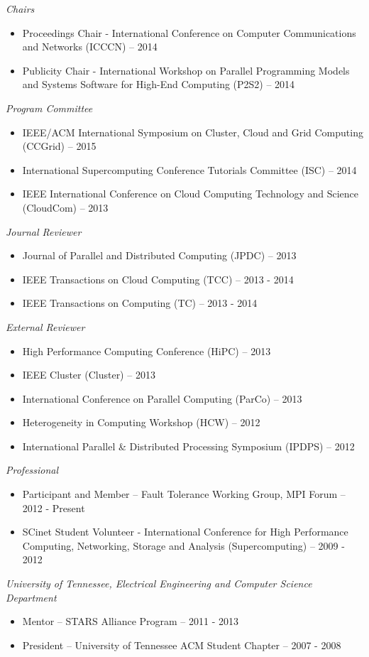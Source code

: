 {\sl Chairs}
\begin{itemize}
    \item Proceedings Chair - International Conference on Computer
        Communications and Networks (ICCCN) -- 2014
    \item Publicity Chair - International Workshop on Parallel Programming
        Models and Systems Software for High-End Computing (P2S2) -- 2014
\end{itemize}

{\sl Program Committee}
\begin{itemize}
    \item IEEE/ACM International Symposium on Cluster, Cloud and Grid
        Computing (CCGrid) -- 2015
    \item International Supercomputing Conference Tutorials Committee (ISC) --
        2014
    \item IEEE International Conference on Cloud Computing Technology and
        Science (CloudCom) -- 2013
\end{itemize}

{\sl Journal Reviewer}
\begin{itemize}
    \item Journal of Parallel and Distributed Computing (JPDC) -- 2013
    \item IEEE Transactions on Cloud Computing (TCC) -- 2013 - 2014
    \item IEEE Transactions on Computing (TC) -- 2013 - 2014
\end{itemize}

{\sl External Reviewer}
\begin{itemize}
    \item High Performance Computing Conference (HiPC) -- 2013
    \item IEEE Cluster (Cluster) -- 2013
    \item International Conference on Parallel Computing (ParCo) -- 2013
    \item Heterogeneity in Computing Workshop (HCW) -- 2012
    \item International Parallel \& Distributed Processing Symposium (IPDPS) -- 2012
\end{itemize}

{\sl Professional}
\begin{itemize}
    \item Participant and Member -- Fault Tolerance Working Group, MPI Forum -- 2012 - Present
    \item SCinet Student Volunteer - International Conference for High
        Performance Computing, Networking, Storage and Analysis
        (Supercomputing) -- 2009 - 2012
\end{itemize}

{\sl University of Tennessee, Electrical Engineering and Computer Science Department}
\begin{itemize}
    \item Mentor -- STARS Alliance Program -- 2011 - 2013
    \item President -- University of Tennessee ACM Student Chapter -- 2007 - 2008
\end{itemize}
